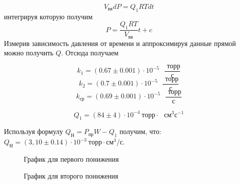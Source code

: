 \documentclass[a4paper,12pt]{article}
\begin{document}
    \begin{equation*}
        V_{вв}dP = Q_1 RTdt
    \end{equation*}
    интегрируя которую получим
    \begin{equation}
        P = \frac{Q_1 RT}{V_{вв}}t + c
    \end{equation}
    Измерив зависимость давления от времени и аппроксимируя данные прямой можно получить $Q$. Отсюда получаем
    
    \[ k_1 = (0.67 \pm 0.001) \cdot 10^{-5} \text{ } \dfrac{\text{ торр}}{с} \] 
    \[ k_2 = (0.7 \pm 0.001) \cdot 10^{-5} \text{ } \dfrac{\text{ торр}}{с} \] 
    \[ k_{ср} = (0.69 \pm 0.001) \cdot 10^{-5} \text{ } \dfrac{\text{ торр}}{с} \] 
    
    \begin{equation}
        Q_1 =(84 \pm 4)\cdot 10^{-4} ~ торр\cdot \text{ }см^3с^{-1}
    \end{equation}

    Используя формулу $Q_Н = P_{пр}W - Q_1$ получим, что: $Q_Н = (3,10 \pm 0.14) \cdot 10^{-3} ~ торр \cdot см^3 / с.$
		

    \begin{figure}[!ht]
		\caption{График для первого понижения}
	\end{figure}

    \begin{figure}[!ht]
		\caption{График для второго понижения}
	\end{figure}
\end{document}

